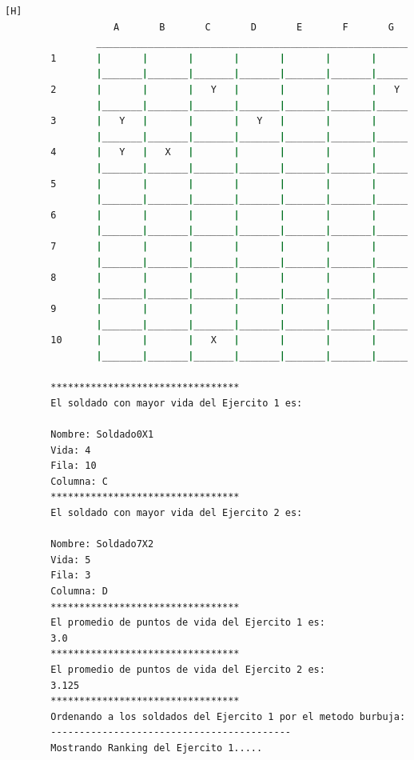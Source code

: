 \documentclass{article}
\begin{document}
\begin{lstlisting}[language=bash,caption={La ejecución: \textcolor{red}{PARA PODER VER LA TABLA COMPLETAMENTE MIRAR LA PLANTILLA DE LATEX O EJECUTARLO: }}][H]
				   A       B       C       D       E       F       G       H       I       J
				_________________________________________________________________________________
		1       |       |       |       |       |       |       |       |       |       |       |
				|_______|_______|_______|_______|_______|_______|_______|_______|_______|_______|
		2       |       |       |   Y   |       |       |       |   Y   |       |       |       |
				|_______|_______|_______|_______|_______|_______|_______|_______|_______|_______|
		3       |   Y   |       |       |   Y   |       |       |       |       |   Y   |       |
				|_______|_______|_______|_______|_______|_______|_______|_______|_______|_______|
		4       |   Y   |   X   |       |       |       |       |       |       |       |       |
				|_______|_______|_______|_______|_______|_______|_______|_______|_______|_______|
		5       |       |       |       |       |       |       |       |       |       |   Y   |
				|_______|_______|_______|_______|_______|_______|_______|_______|_______|_______|
		6       |       |       |       |       |       |       |       |       |       |       |
				|_______|_______|_______|_______|_______|_______|_______|_______|_______|_______|
		7       |       |       |       |       |       |       |       |       |       |       |
				|_______|_______|_______|_______|_______|_______|_______|_______|_______|_______|
		8       |       |       |       |       |       |       |       |   Y   |       |       |
				|_______|_______|_______|_______|_______|_______|_______|_______|_______|_______|
		9       |       |       |       |       |       |       |       |       |       |       |
				|_______|_______|_______|_______|_______|_______|_______|_______|_______|_______|
		10      |       |       |   X   |       |       |       |       |       |   X   |       |
				|_______|_______|_______|_______|_______|_______|_______|_______|_______|_______|
		
		*********************************
		El soldado con mayor vida del Ejercito 1 es: 
		
		Nombre: Soldado0X1
		Vida: 4
		Fila: 10
		Columna: C
		*********************************
		El soldado con mayor vida del Ejercito 2 es: 
		
		Nombre: Soldado7X2
		Vida: 5
		Fila: 3
		Columna: D
		*********************************
		El promedio de puntos de vida del Ejercito 1 es: 
		3.0
		*********************************
		El promedio de puntos de vida del Ejercito 2 es: 
		3.125
		*********************************
		Ordenando a los soldados del Ejercito 1 por el metodo burbuja: 
		------------------------------------------
		Mostrando Ranking del Ejercito 1.....
		

\end{lstlisting}
\end{document}
